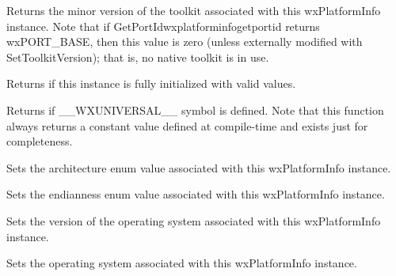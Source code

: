 
Returns the minor version of the toolkit associated with this wxPlatformInfo instance.
Note that if {GetPortId}{wxplatforminfogetportid} returns wxPORT_BASE, then this value is zero (unless externally modified with SetToolkitVersion); that is, no native toolkit is in use.




\label{wxplatforminfoisok}


Returns \true if this instance is fully initialized with valid values.



\label{wxplatforminfoisusinguniversalwidgets}


Returns \true if __WXUNIVERSAL__ symbol is defined. Note that this function always
returns a constant value defined at compile-time and exists just for completeness.


\label{wxplatforminfosetarchitecture}


Sets the architecture enum value associated with this wxPlatformInfo instance.



\label{wxplatforminfosetendianness}


Sets the endianness enum value associated with this wxPlatformInfo instance.


\label{wxplatforminfosetosversion}


Sets the version of the operating system associated with this wxPlatformInfo instance.



\label{wxplatforminfosetoperatingsystemid}


Sets the operating system associated with this wxPlatformInfo instance.



